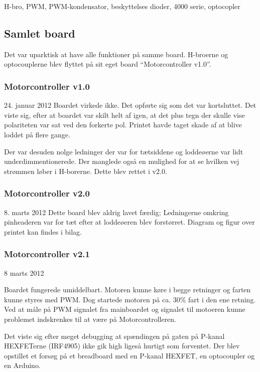\documentclass[a4paper,oneside,article,danish,table,draft]{memoir}
\newcommand{\boarddate}[1]{\textcolor{blue!80!black}{#1}}
\begin{document}
H-bro, PWM, PWM-kondensator, beskyttelses dioder, 4000 serie, optocopler

\subsection{Samlet board}
Det var uparktisk at have alle funktioner på samme board. H-broerne og optocouplerne blev flyttet på sit eget board “Motorcontroller v1.0”.

\subsubsection{Motorcontroller v1.0}
\boarddate{24. januar 2012}
Boardet virkede ikke. Det opførte sig som det var kortsluttet. Det viste sig, efter at boardet var skilt helt af igen, at det plus tegn der skulle vise polariteten var sat ved den forkerte pol. Printet havde taget skade af at blive loddet på flere gange.

Der var desuden nolge ledninger der var for tætsiddene og loddeøerne var lidt underdimmentionerede. Der manglede også en mulighed for at se hvilken vej strømmen løber i H-borerne. Dette blev rettet i v2.0.
\subsubsection{Motorcontroller v2.0}
\boarddate{8. marts 2012} Dette board blev aldrig lavet færdig; Ledningerne omkring pinheaderen var for tæt efter at loddeøeren blev forstørret. Diagram og figur over printet kan findes i bilag. 

\subsubsection{Motorcontroller v2.1}
\boarddate{8 marts 2012}


Boardet fungerede umiddelbart. Motoren kunne køre i begge retninger og farten kunne styres med PWM. Dog startede motoren på ca. 30\% fart i den ene retning. Ved at måle på PWM signalet fra mainboardet og signalet til motoeren kunne problemet indskrenkes til at være på Motorcontrolleren.

Det viste sig efter meget debugging at spændingen på gaten på P-kanal HEXFETerne (IRF4905) ikke gik high ligeså hurtigt som forventet. Der blev opstillet et forsøg på et breadboard med en P-kanal HEXFET, en optocoupler og en Arduino.
\end{document}
